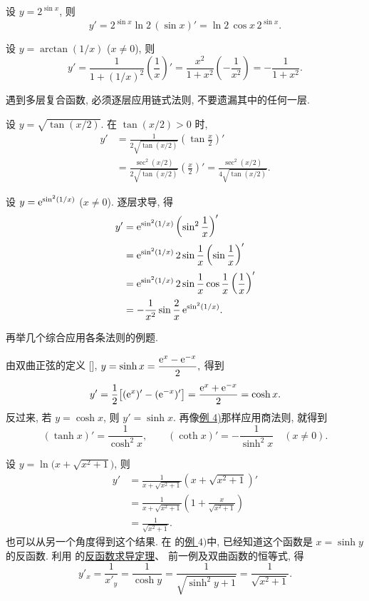 \label{ex:differentiate_two_power_sine}
设 $y=2^{\sin x}$, 则
$$
y'=2^{\sin x}\ln2\,(\sin x)'=\ln2\,\cos x\,2^{\sin x}.
$$

\label{ex:differentiate_arctan_reciprocal}
设 $y=\arctan(1/x)$ ($x\ne0$), 则
$$
y'=\frac1{1+(1/x)^2}\left(\frac1x\right)'
=\frac{x^2}{1+x^2}\left(-\frac1{x^2}\right)
=-\frac1{1+x^2}.
$$

遇到多层复合函数, 必须逐层应用链式法则, 不要遗漏其中的任何一层.

\label{ex:differentiate_nested_tangent_root}
设 $y=\sqrt{\tan(x/2)}$.
在 $\tan(x/2)>0$ 时,
\begin{align*}
y'&=\frac1{2\sqrt{\tan(x/2)}}\left(\tan\frac x2\right)'\\
&=\frac{\sec^2(x/2)}{2\sqrt{\tan(x/2)}}\left(\frac x2\right)'
=\frac{\sec^2(x/2)}{4\sqrt{\tan(x/2)}}.
\end{align*}

\begingroup
\setlength{\abovedisplayskip}{6pt plus 2pt minus 2pt}
\setlength{\belowdisplayskip}{6pt plus 2pt minus 2pt}
\setlength{\abovedisplayshortskip}{3pt plus 2pt}
\setlength{\belowdisplayshortskip}{6pt plus 2pt minus 2pt}
\setlength{\jot}{2pt}
\label{ex:differentiate_nested_exponential_sine}
设 $y=\mathrm{e}^{\sin^2(1/x)}$ ($x\ne0$).
逐层求导, 得
\begin{align*}
y'&=\mathrm{e}^{\sin^2(1/x)}\left(\sin^2\frac1x\right)'\\
&=\mathrm{e}^{\sin^2(1/x)}\,2\sin\frac1x\left(\sin\frac1x\right)'\\
&=\mathrm{e}^{\sin^2(1/x)}\,2\sin\frac1x\cos\frac1x
 \left(\frac1x\right)'\\
&=-\frac1{x^2}\sin\frac2x\,\mathrm{e}^{\sin^2(1/x)}.
\end{align*}

再举几个综合应用各条法则的例题.

\label{ex:differentiate_hyperbolic_functions}
由双曲正弦的定义 [],
$
y=\sinh x=\dfrac{\mathrm{e}^x-\mathrm{e}^{-x}}2,
$
得到
$$
y'=\frac12\bigl[(\mathrm{e}^x)'-(\mathrm{e}^{-x})'\bigr]
=\frac{\mathrm{e}^x+\mathrm{e}^{-x}}2=\cosh x.
$$
反过来, 若 $y=\cosh x$, 则 $y'=\sinh x$.
再像\hyperref[ex:differentiate_tangent_again]{例 4)}那样应用商法则, 就得到
$$
(\tanh x)'=\frac1{\cosh^2x},\qquad
(\coth x)'=-\frac1{\sinh^2x}\quad(x\ne0).
$$

\label{ex:differentiate_inverse_hyperbolic_sine_form}
设 $y=\ln\bigl(x+\sqrt{x^2+1}\bigr)$, 则
\begin{align*}
y'&=\frac1{x+\sqrt{x^2+1}}\left(x+\sqrt{x^2+1}\right)'\\
&=\frac1{x+\sqrt{x^2+1}}
 \left(1+\frac{x}{\sqrt{x^2+1}}\right)\\
&=\frac1{\sqrt{x^2+1}}.
\end{align*}
也可以从另一个角度得到这个结果.
在  的\hyperref[ex:inverse_hyperbolic_sine]{例 $4)$}中,
已经知道这个函数是 $x=\sinh y$ 的反函数.
利用  的\hyperref[thm:inverse_function_derivative]{反函数求导定理}、
前一例及双曲函数的恒等式, 得
$$
y'_x=\frac1{x'_y}=\frac1{\cosh y}
=\frac1{\sqrt{\sinh^2y+1}}=\frac1{\sqrt{x^2+1}}.
$$

